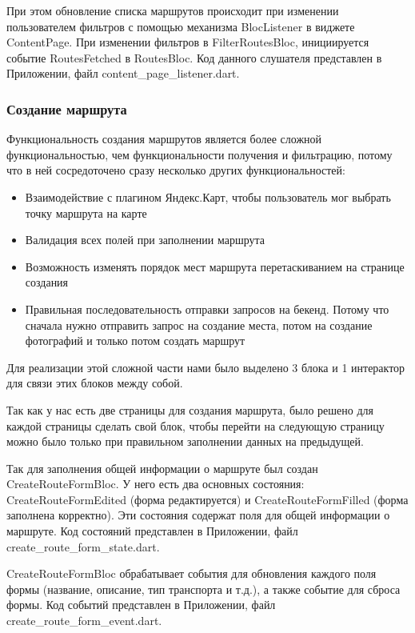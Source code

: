 При этом обновление списка маршрутов происходит при изменении пользователем фильтров с помощью механизма BlocListener в виджете ContentPage. При изменении фильтров в FilterRoutesBloc, инициируется событие RoutesFetched в RoutesBloc. Код данного слушателя представлен в Приложении, файл content\_page\_listener.dart.

\subsubsection*{Создание маршрута}
Функциональность создания маршрутов является более сложной функциональностью, чем функциональности получения и фильтрацию, потому что в ней сосредоточено сразу несколько других функциональностей:

\begin{itemize}
    \item Взаимодействие с плагином Яндекс.Карт, чтобы пользователь мог выбрать точку маршрута на карте
    \item Валидация всех полей при заполнении маршрута
    \item Возможность изменять порядок мест маршрута перетаскиванием на странице создания
    \item Правильная последовательность отправки запросов на бекенд. Потому что сначала нужно отправить запрос на создание места, потом на создание фотографий и только потом создать маршрут
\end{itemize}

\noindent Для реализации этой сложной части нами было выделено 3 блока и 1 интерактор для связи этих блоков между собой.

Так как у нас есть две страницы для создания маршрута, было решено для каждой страницы сделать свой блок, чтобы перейти на следующую страницу можно было только при правильном заполнении данных на предыдущей. 

Так для  заполнения общей информации о маршруте был создан CreateRouteFormBloc. У него есть два основных состояния: CreateRouteFormEdited (форма редактируется) и CreateRouteFormFilled (форма заполнена корректно). Эти состояния содержат поля для общей информации о маршруте. Код состояний представлен в Приложении, файл create\_route\_form\_state.dart.

CreateRouteFormBloc обрабатывает события для обновления каждого поля формы (название, описание, тип транспорта и т.д.), а также событие для сброса формы. Код событий представлен в Приложении, файл create\_route\_form\_event.dart.

